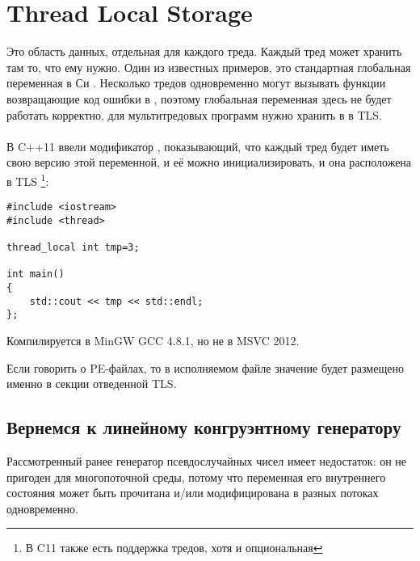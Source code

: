 \section{Thread Local Storage}
\label{TLS}

Это область данных, отдельная для каждого треда. Каждый тред может хранить там то, что ему нужно.
Один из известных примеров, это стандартная глобальная переменная в Си . 
Несколько тредов одновременно могут вызывать функции возвращающие код ошибки в , поэтому глобальная переменная здесь не будет работать корректно, 
для мультитредовых программ  нужно хранить в в \ac{TLS}. \\
\\
В C++11 ввели модификатор , показывающий, что каждый тред будет иметь свою версию этой переменной, и её можно инициализировать, и она расположена в \ac{TLS}
\footnote{ В C11 также есть поддержка тредов, хотя и опциональная}:

\begin{lstlisting}[caption=C++11,style=customc]
#include <iostream>
#include <thread>

thread_local int tmp=3;

int main()
{
	std::cout << tmp << std::endl;
};
\end{lstlisting}

Компилируется в MinGW GCC 4.8.1, но не в MSVC 2012.

Если говорить о PE-файлах, то в исполняемом файле значение  будет размещено именно в секции отведенной \ac{TLS}.

\subsection{Вернемся к линейному конгруэнтному генератору}
\label{LCG_TLS}

Рассмотренный ранее  генератор псевдослучайных чисел имеет недостаток:
он не пригоден для многопоточной среды, потому что переменная его внутреннего состояния может быть
прочитана и/или модифицирована в разных потоках одновременно.





